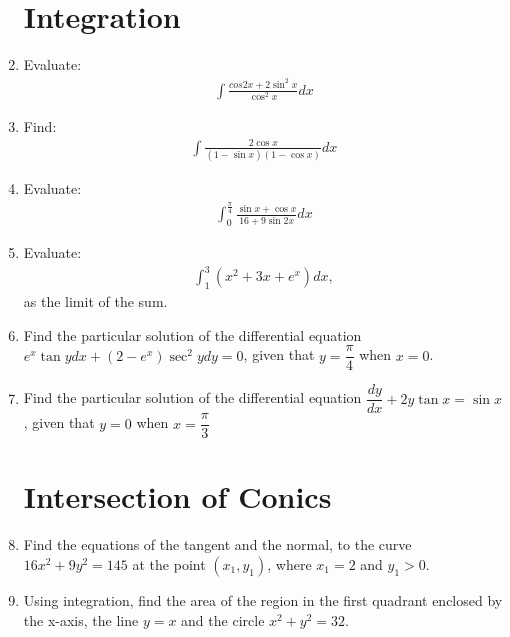 \documentclass{article}
\providecommand{\brak}[1]{\ensuremath{\left(#1\right)}}
\begin{document}
\begin{enumerate}
\section{Integration}
\item Evaluate: 
\begin{align*}
    \int \frac{cos 2x +  2\sin^{2}x}{\cos^{2}x}dx 
\end{align*}
\item Find: 
\begin{align*}
    \int \frac{2\cos x}{\brak{1-\sin x}\brak{1-\cos x}}dx 
\end{align*}
\item Evaluate:
\begin{align*}
    \int_{0}^{\frac{\pi}{4}}\frac{\sin x + \cos x}{16 + 9 \sin 2x}dx
\end{align*}
\item Evaluate:
\begin{align*}
    \int_{1}^{3} \brak{x^2 + 3x + e^x}dx,
\end{align*}
as the limit of the sum.
\item Find the particular solution of the differential equation $e^{x}\tan y dx+\brak{2-e^{x}}\sec^{2}y dy=0$, given that $y=\dfrac {\pi}{4}$ when $x=0$.
\item Find the particular solution of the differential equation $\dfrac {dy}{dx} +2y \tan x= \sin x$, given that $y=0$ when $x=\dfrac{\pi}{3}$	

\section{Intersection of Conics}
\item Find the equations of the tangent and the normal, to the curve $16x^{2}+9y^{2}=145$ at the point $\brak{x_{1},y_{1}}$, where $x_{1}=2$ and $y_{1}>0$.
\item Using integration, find the area of the region in the first quadrant enclosed by the x-axis, the line $y = x$ and the circle $x^{2}+y^{2} = 32.$

\end{enumerate}
\end{document}
